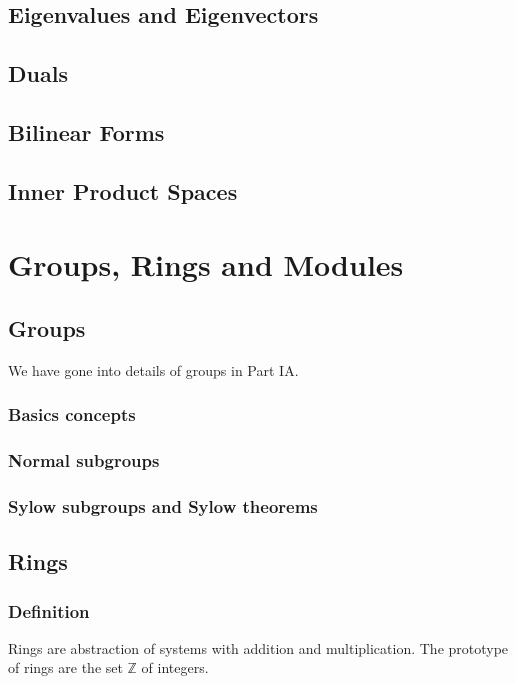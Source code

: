 \documentclass[12pt]{book}
\newcommand{\ZZ}{\mathbb Z}
\theoremstyle{definition}
\theoremstyle{remark}
\begin{document}
		\section{Eigenvalues and Eigenvectors}
		
		\section{Duals}
		
		\section{Bilinear Forms}
		
		\section{Inner Product Spaces}
		
		
	\chapter{Groups, Rings and Modules}
		\section{Groups}
		We have gone into details of groups in Part IA.
			\subsection{Basics concepts}
			
			\subsection{Normal subgroups}
			
			\subsection{Sylow subgroups and Sylow theorems}
		\section{Rings}
			\subsection{Definition}
			Rings are abstraction of systems with addition and multiplication. The prototype of rings are the set $\ZZ$ of integers.
			
\end{document}
